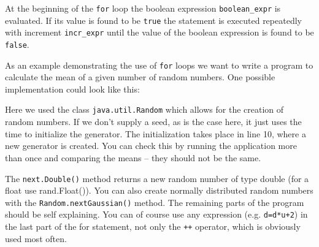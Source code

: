 At the beginning of the \verb|for| loop the boolean expression
\verb|boolean_expr| is evaluated. If its value is found to be 
\verb|true| the statement is executed repeatedly with increment
\verb|incr_expr| until the value of the boolean expression is found to
be \verb|false|.

As an example demonstrating the use of
\verb|for| loops we want to write a program to calculate the mean of
a given number of random numbers. One possible implementation
could look like this:

Here we used the class \verb|java.util.Random| which allows for
the creation of random numbers. If we don't supply a seed, as is the
case here, it just uses the time to initialize the generator. The
initialization takes place in line 10, where a new generator is created.
You can check this by running the application more than once and comparing
the means -- they should not be the same. 

The \verb|next.Double()| method returns a new random number of type
double (for a float use rand.Float()). You can also create normally 
distributed random numbers with the \verb|Random.nextGaussian()| method.
The remaining parts of the program should be self explaining. You can of
course use any expression (e.g. \verb|d=d*u+2|) 
in the last part of the for statement, not only
the \verb|++| operator, which is obviously used most often. 

